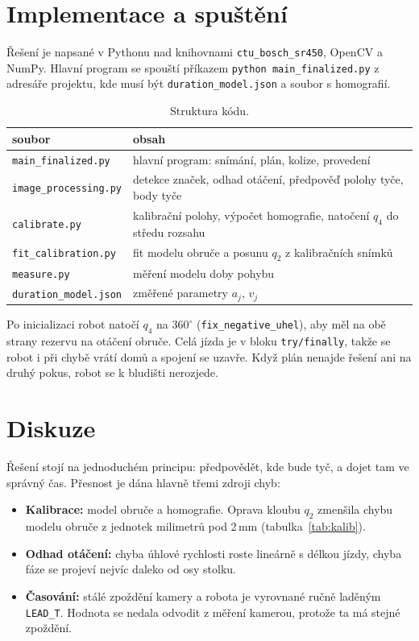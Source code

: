 \documentclass[11pt,a4paper]{article}
\begin{document}
\section{Implementace a spuštění}

Řešení je napsané v Pythonu nad knihovnami \texttt{ctu\_bosch\_sr450}, OpenCV a NumPy. Hlavní
program se spouští příkazem \texttt{python main\_finalized.py} z adresáře projektu, kde musí
být \texttt{duration\_model.json} a soubor s homografií.

\begin{table}[ht]
\centering
\begin{tabularx}{\linewidth}{@{}l X@{}}
\toprule
soubor & obsah \\
\midrule
\texttt{main\_finalized.py} & hlavní program: snímání, plán, kolize, provedení \\
\texttt{image\_processing.py} & detekce značek, odhad otáčení, předpověď polohy tyče, body tyče \\
\texttt{calibrate.py} & kalibrační polohy, výpočet homografie, natočení $q_4$ do středu rozsahu \\
\texttt{fit\_calibration.py} & fit modelu obruče a posunu $q_2$ z kalibračních snímků \\
\texttt{measure.py} & měření modelu doby pohybu \\
\texttt{duration\_model.json} & změřené parametry $a_j$, $v_j$ \\
\bottomrule
\end{tabularx}
\caption{Struktura kódu.}
\end{table}

Po inicializaci robot natočí $q_4$ na $360^\circ$ (\texttt{fix\_negative\_uhel}), aby měl na obě
strany rezervu na otáčení obruče. Celá jízda je v bloku \texttt{try/finally}, takže se robot
i při chybě vrátí domů a spojení se uzavře. Když plán nenajde řešení ani na druhý pokus,
robot se k bludišti nerozjede.

\section{Diskuze}

Řešení stojí na jednoduchém principu: předpovědět, kde bude tyč, a dojet tam ve správný čas.
Přesnost je dána hlavně třemi zdroji chyb:
\begin{itemize}
  \item \textbf{Kalibrace:} model obruče a homografie. Oprava kloubu $q_2$ zmenšila chybu modelu
        obruče z jednotek milimetrů pod 2\,mm (tabulka~\ref{tab:kalib}).
  \item \textbf{Odhad otáčení:} chyba úhlové rychlosti roste lineárně s délkou jízdy, chyba fáze
        se projeví nejvíc daleko od osy stolku.
  \item \textbf{Časování:} stálé zpoždění kamery a robota je vyrovnané ručně laděným
        \texttt{LEAD\_T}. Hodnota se nedala odvodit z měření kamerou, protože ta má stejné zpoždění.
\end{itemize}
\end{document}
